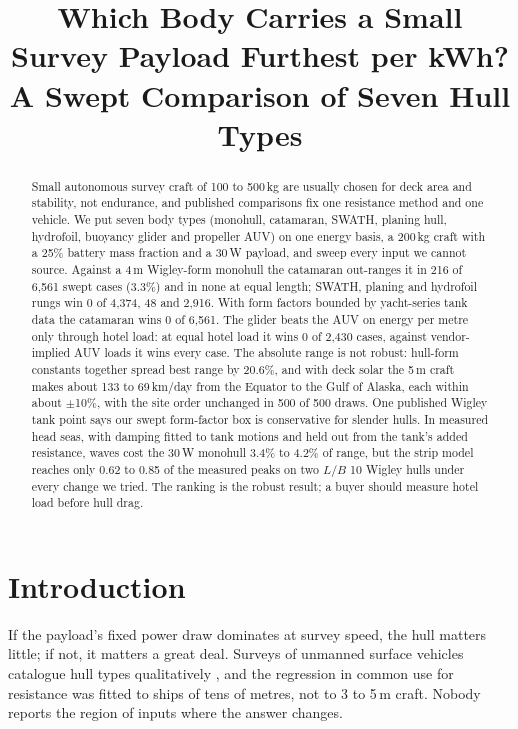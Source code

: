 \documentclass[conference]{IEEEtran}
\begin{document}
\title{Which Body Carries a Small Survey Payload Furthest per kWh?\\ A Swept Comparison of Seven Hull Types}
\author{
}
\maketitle

\begin{abstract}
Small autonomous survey craft of 100 to 500\,kg are usually chosen for deck area and stability,
not endurance, and published comparisons fix one resistance method and one vehicle. We put seven
body types (monohull, catamaran, SWATH, planing hull, hydrofoil, buoyancy glider and propeller
AUV) on one energy basis, a 200\,kg craft with a 25\% battery mass fraction and a 30\,W payload,
and sweep every input we cannot source. Against a 4\,m Wigley-form monohull the catamaran
out-ranges it in 216 of 6{,}561 swept cases (3.3\%) and in none at equal length; SWATH, planing
and hydrofoil rungs win 0 of 4{,}374, 48 and 2{,}916. With form factors bounded by yacht-series
tank data the catamaran wins 0 of 6{,}561. The glider beats the AUV on energy per metre only
through hotel load: at equal hotel load it wins 0 of 2{,}430 cases, against vendor-implied AUV
loads it wins every case. The absolute range is not robust: hull-form constants together spread
best range by 20.6\%, and with deck solar the 5\,m craft makes about 133 to 69\,km/day from the
Equator to the Gulf of Alaska, each within about $\pm$10\%, with the site order unchanged in 500
of 500 draws. One published Wigley tank point says our swept form-factor box is conservative for
slender hulls. In measured head seas, with damping fitted to tank motions and held out from the tank's added resistance, waves cost the 30\,W monohull 3.4\% to 4.2\% of range, but the strip model reaches only 0.62 to 0.85 of the measured peaks on two $L/B$ 10 Wigley hulls under every change we tried. The ranking is the robust result; a buyer should measure hotel load before hull drag.
\end{abstract}

\section{Introduction}
If the payload's fixed power draw dominates at survey speed, the hull matters little; if not, it
matters a great deal. Surveys of unmanned surface vehicles catalogue hull types qualitatively
\cite{manley2008,liu2016}, and the regression in common use for resistance \cite{holtrop1982} was
fitted to ships of tens of metres, not to 3 to 5\,m craft. Nobody reports the region of inputs
where the answer changes.
\end{document}
